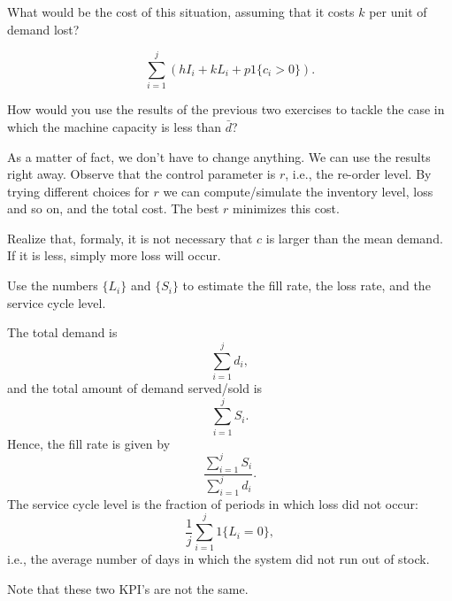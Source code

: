 \begin{question}
  What would be the cost of this situation, assuming that it costs $k$
  per unit of demand lost? 
\begin{solution}
  \begin{equation*}
    \sum_{i=1}^j \left(h I_{i} + k L_i + p1\{c_i>0\}\right).
  \end{equation*}
\end{solution}
\end{question}

\begin{question}
  How would you use the results of the previous two exercises to tackle the case in which the machine capacity is less than $\bar d$?
  \begin{solution}
    As a matter of fact, we don't have to change anything. We can use
    the results right away. Observe that the control parameter is $r$,
    i.e., the re-order level. By trying different choices for $r$ we
    can compute/simulate the inventory level, loss and so on, and the
    total cost. The best $r$ minimizes this cost.

    Realize that, formaly, it is not necessary that $c$ is larger than
    the mean demand. If it is less, simply more loss will occur.
  \end{solution}
\end{question}


\begin{question}
  Use the numbers $\{L_i\}$ and $\{S_i\}$ to estimate the fill rate,
  the loss rate, and the service cycle level.
\begin{solution}
The total demand is
\begin{equation*}
 \sum_{i=1}^j d_i, 
\end{equation*}
and the total amount of demand served/sold is 
\begin{equation*}
 \sum_{i=1}^j S_i.
\end{equation*}
Hence, the fill rate is given by
\begin{equation*}
  \frac{\sum_{i=1}^j S_i}{\sum_{i=1}^j d_i}.
\end{equation*}
The service cycle level is the fraction of periods in which loss did not occur:
\begin{equation*}
  \frac 1 j \sum_{i=1}^j 1\{L_i=0\}, 
\end{equation*}
i.e., the average number of days in which the system did not run out of stock.

Note that these two KPI's are not the same. 
\end{solution}
\end{question}

